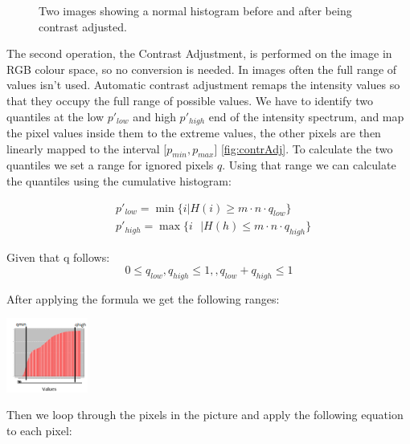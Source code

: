 \documentclass[journal,transmag]{IEEEtran}
\begin{document}
\begin{figure}[h!] %
	\centering
	\caption{Two images showing a normal histogram before and after being contrast adjusted.}
	\label{fig:contrAdjustedHist}
\end{figure}

The second operation, the Contrast Adjustment, is performed on the image in RGB colour space, so no conversion is needed. In images often the full range of values isn't used. Automatic contrast adjustment remaps the intensity values so that they occupy the full range of possible values\cite{automaticContrast}. We have to identify two quantiles at the low $p'_{low}$ and high $p'_{high}$ end of the intensity spectrum, and map the pixel values inside them to the extreme values, the other pixels are then linearly mapped to the interval [$p_{min}, p_{max}$] \ref{fig:contrAdj}. To calculate the two quantiles we set a range for ignored pixels $q$. Using that range we can calculate the quantiles using the cumulative histogram:

\begin{equation} %
\begin{aligned}
&p'_{low} = \min\{i | H(i) \geq m\cdot n \cdot q_{low}\}\\
&p'_{high} = \max\{i \text{ } | H(h) \leq m\cdot n \cdot q_{high}\}
\end{aligned}
\end{equation}

Given that q follows: 
\begin{equation}
0 \leq q_{low}, q_{high} \leq 1, , q_{low} + q_{high} \leq 1
\end{equation}

After applying the formula we get the following ranges:
\begin{center}
	 \includegraphics[width=0.2\textwidth]{figures/cum_hist_range.png}
	 \label{fig:cumulativeHistRange}
\end{center}
Then we loop through the pixels in the picture and apply the following equation to each pixel: 
\end{document}
